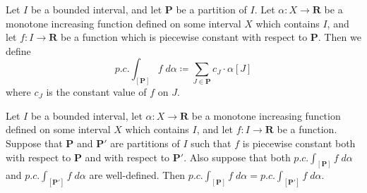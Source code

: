 \begin{definition}\label{11.8.5}
    Let \(I\) be a bounded interval, and let \(\mathbf{P}\) be a partition of \(I\).
    Let \(\alpha : X \to \mathbf{R}\) be a monotone increasing function defined on some interval \(X\) which contains \(I\), and let \(f : I \to \mathbf{R}\) be a function which is piecewise constant with respect to \(\mathbf{P}\).
    Then we define
    \[
        p.c. \int_{[\mathbf{P}]} f \; d \alpha \coloneqq \sum_{J \in \mathbf{P}} c_J \cdot \alpha[J]
    \]
    where \(c_J\) is the constant value of \(f\) on \(J\).
\end{definition}

\begin{additional corollary}\label{ac 11.8.3}
Let \(I\) be a bounded interval, let \(\alpha : X \to \mathbf{R}\) be a monotone increasing function defined on some interval \(X\) which contains \(I\), and let \(f : I \to \mathbf{R}\) be a function.
Suppose that \(\mathbf{P}\) and \(\mathbf{P}'\) are partitions of \(I\) such that \(f\) is piecewise constant both with respect to \(\mathbf{P}\) and with respect to \(\mathbf{P}'\).
Also suppose that both \(p.c. \int_{[\mathbf{P}]} f \; d \alpha\) and \(p.c. \int_{[\mathbf{P}']} f \; d \alpha\) are well-defined.
Then \(p.c. \int_{[\mathbf{P}]} f \; d \alpha = p.c. \int_{[\mathbf{P}']} f \; d \alpha\).
\end{additional corollary}

